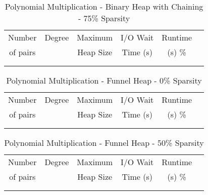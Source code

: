 \documentclass[11pt, one-sided]{amsart}
\begin{document}
\begin{table}[htbp]
   \centering
      \caption{Polynomial Multiplication - Binary Heap with Chaining - 75\% Sparsity}
   \begin{tabular}{|c|c|c|c|c|c|}
   	\hline
		 Number   & 	Degree	& Maximum & I/O Wait		& Runtime 	 \\ 
		 of pairs 	&			& Heap Size	& Time (s)		&	(s)		 		\%				\\ \hline
		 		&			&			&			&						\\
		 		&			&			&			&						\\
   \end{tabular}
   \label{tab:booktabs}
\end{table}







\newpage


\begin{table}[htbp]
   \centering
      \caption{Polynomial Multiplication - Funnel Heap - 0\% Sparsity}
   \begin{tabular}{|c|c|c|c|c|c|}
   	\hline
		 Number   & 	Degree	& Maximum & I/O Wait		&  Runtime  \\ 
		 of pairs 	&			& Heap Size	& Time (s)		&	(s)	 		\%				\\ \hline
		 		&			&			&			&					\\
		 		&			&			&			&					\\
   \end{tabular}
   \label{tab:booktabs}
\end{table}

\begin{table}[htbp]
   \centering
      \caption{Polynomial Multiplication - Funnel Heap - 50\% Sparsity}
   \begin{tabular}{|c|c|c|c|c|c|}
   	\hline
		 Number   & 	Degree	& Maximum & 	I/O Wait	&  Runtime 	 \\ 
		 of pairs 	&			& Heap Size	& 	Time (s)		&	(s)	 		\%				\\ \hline
		 		&			&			&			&						\\
		 		&			&			&			&						\\
   \end{tabular}
   \label{tab:booktabs}
\end{table}
\end{document}
